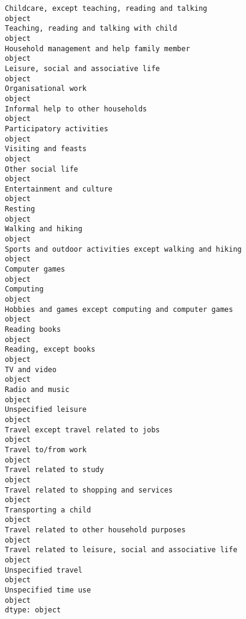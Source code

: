 \documentclass[11pt]{article}
\begin{document}
\begin{Verbatim}[commandchars=\\\{\}]
Childcare, except teaching, reading and talking                                    object
Teaching, reading and talking with child                                           object
Household management and help family member                                        object
Leisure, social and associative life                                               object
Organisational work                                                                object
Informal help to other households                                                  object
Participatory activities                                                           object
Visiting and feasts                                                                object
Other social life                                                                  object
Entertainment and culture                                                          object
Resting                                                                            object
Walking and hiking                                                                 object
Sports and outdoor activities except walking and hiking                            object
Computer games                                                                     object
Computing                                                                          object
Hobbies and games except computing and computer games                              object
Reading books                                                                      object
Reading, except books                                                              object
TV and video                                                                       object
Radio and music                                                                    object
Unspecified leisure                                                                object
Travel except travel related to jobs                                               object
Travel to/from work                                                                object
Travel related to study                                                            object
Travel related to shopping and services                                            object
Transporting a child                                                               object
Travel related to other household purposes                                         object
Travel related to leisure, social and associative life                             object
Unspecified travel                                                                 object
Unspecified time use                                                               object
dtype: object

    \end{Verbatim}
\end{document}
